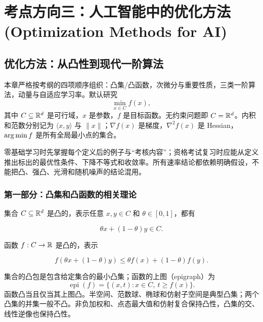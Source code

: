 \chapter{考点方向三：人工智能中的优化方法 (Optimization Methods for AI)}
\label{ch:optimization}

\section{优化方法：从凸性到现代一阶算法}


\begin{teaching}
本章严格按考纲的四项顺序组织：凸集/凸函数，次微分与重要性质，三类一阶算法，动量与自适应学习率。默认研究
\[
  \min_{x\in C}f(x),
\]
其中 \(C\subseteq\mathbb{R}^d\) 是可行域，\(x\) 是参数，\(f\) 是目标函数。无约束问题即 \(C=\mathbb{R}^d\)。内积和范数分别记为 \(\langle x,y\rangle\) 与 \(\|x\|\)；\(\nabla f(x)\) 是梯度，\(\nabla^2f(x)\) 是 Hessian，\(\operatorname*{arg\,min} f\) 是所有全局最小点的集合。
\end{teaching}

\begin{remark}[怎样使用本章]
零基础学习时先掌握每个定义后的例子与“考核内容”；资格考试复习时应能从定义推出标出的最优性条件、下降不等式和收敛率。所有速率结论都依赖明确假设，不能把凸、强凸、光滑和随机噪声的结论混用。
\end{remark}

\subsection{第一部分：凸集和凸函数的相关理论}


集合 \(C\subseteq\mathbb{R}^d\) 是凸的，表示任意 \(x,y\in C\) 和 \(\theta\in[0,1]\)，都有

\[
  \theta x+(1-\theta)y\in C.
\]

函数 \(f:C\to\mathbb{R}\) 是凸的，表示

\[
  f(\theta x+(1-\theta)y)
  \le
  \theta f(x)+(1-\theta)f(y).
\]

集合的凸包是包含给定集合的最小凸集；函数的上图（epigraph）为
\[
  \operatorname{epi}(f)=\{(x,t):x\in C,\ t\ge f(x)\}.
\]
函数凸当且仅当其上图凸。半空间、范数球、椭球和仿射子空间是典型凸集；两个凸集的并集一般不凸。非负加权和、点态最大值和仿射复合保持凸性，凸集的交、线性逆像也保持凸性。


